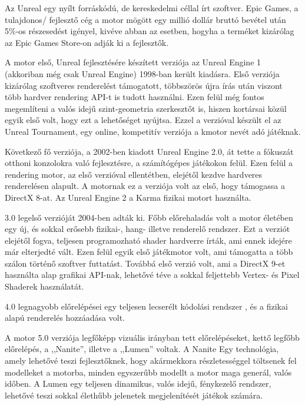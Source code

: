 \documentclass[
]{thesis-ekf}
\theoremstyle{definition}
\theoremstyle{remark}
\begin{document}
	Az Unreal egy nyílt forráskódú, de kereskedelmi céllal írt szoftver.\cite{unrealLicense}  Epic Games, a tulajdonos/ fejlesztő cég a motor mögött egy millió dollár bruttó bevétel után 5\%-os részesedést igényel, kivéve abban az esetben, hogyha a terméket kizárólag az Epic Games Store-on adják ki a fejlesztők.\cite{unrealPopularity}
	
	A motor első, Unreal fejlesztésére készített verziója az Unreal Engine 1 (akkoriban még csak Unreal Engine) 1998-ban került kiadásra. Első verziója kizárólag szoftveres renderelést támogatott, többszörös újra írás után viszont több hardver rendering API-t is tudott használni. Ezen felül még fontos megemlíteni a valós idejű szint-geometria szerkesztőt is, hiszen kortársai közül egyik első volt, hogy ezt a lehetőséget nyújtsa. Ezzel a verzióval készült el az Unreal Tournament, egy online, kompetitív verziója a kmotor nevét adó játéknak.
	
	Következő fő verziója, a 2002-ben kiadott Unreal Engine 2.0\cite{unreal2Released}, át tette a fókuszát otthoni konzolokra való fejlesztésre, a számítógépes játékokon felül. \cite{historyOfUnreal} Ezen felül a rendering motor, az első verzióval ellentétben, elejétől kezdve hardveres renderelésen alapult. A motornak ez a verziója volt az első, hogy támogassa a DirectX 8-at. Az Unreal Engine 2 a Karma fizikai motort használta.
	
	3.0 legelső verzióját 2004-ben adták ki. Főbb előrehaladás volt a motor életében egy új, és sokkal erősebb fizikai-, hang- illetve renderelő rendszer. \cite{anEpicNextGenAdventure} Ezt a verziót elejétől fogva, teljesen programozható shader hardverre írták, ami ennek idejére már elterjedté vált. Ezen felül egyik első játékmotor volt, ami támogatta a több szálon történő szoftver futtatást.\cite{unrealMultithreaded} Továbbá első verzió volt, ami a DirectX 9-et használta alap grafikai API-nak, lehetővé téve a sokkal feljettebb Vertex- és Pixel Shaderek használatát.
	
	4.0 legnagyobb előrelépései egy teljesen lecserélt kódolási rendszer \cite{unrealBlueprint}, és a fizikai alapú renderelés hozzáadása volt.
	
	A motor 5.0 verziója legfőképp vizuális irányban tett előrelépéseket, kettő legfőbb előrelépés, a ,,Nanite'', illetve a ,,Lumen'' voltak. A Nanite Egy technológia, amely lehetővé teszi fejlesztőknek, hogy akármekkora részletességgel töltsenek fel modelleket a motorba, minden egyszerűbb modellt a motor maga generál, valós időben. A Lumen egy teljesen dinamikus, valós idejű, fénykezelő rendszer, lehetővé teszi sokkal élethűbb jelenetek megjelenítését játékok számára.
	
\end{document}
